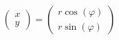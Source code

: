 \documentclass[a4paper, 11pt]{article}
\newcommand{\polar}[2]{\left(\begin{array}{cc}
    #1\cos(#2) \\
    #1\sin(#2)
\end{array}\right)}
\begin{document}
\[ \left(\begin{array}{cc}
    x \\
    y
\end{array}\right) 
=
\polar{r}{\varphi}
\]
\end{document}
